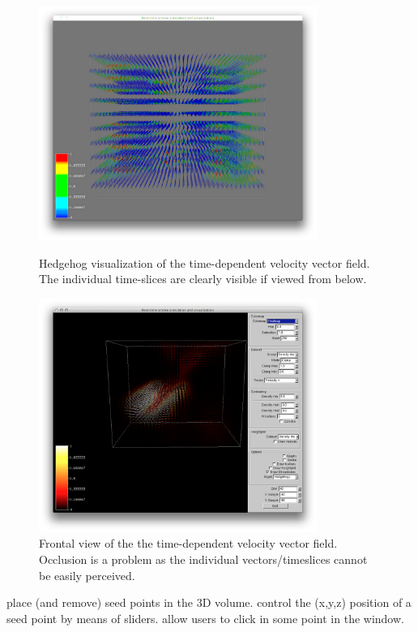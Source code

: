  \begin{figure}[htbp]
 \centering
 \begin{minipage}[t]{0.48\textwidth}
 \includegraphics[height=3in]{figures/streamtubes/30datacube_bottom.png}
 \caption{Hedgehog visualization of the time-dependent velocity vector field. The individual time-slices are clearly visible if viewed from below.}
 \label{fig:datacube_bottom}
 \end{minipage}\hspace{.04\textwidth}%
 \begin{minipage}[t]{0.48\textwidth}
 \includegraphics[height=3in]{figures/streamtubes/31datacube_front.png}
 \caption{Frontal view of the the time-dependent velocity vector field. Occlusion is a problem as the individual vectors/timeslices cannot be easily perceived.}
 \label{fig:}
 \end{minipage}
 \end{figure}
 
 
 place (and remove) seed points in the 3D volume.
 control the (x,y,z) position of a seed point by means of sliders. 
 allow users to click in some point in the window. 
 

